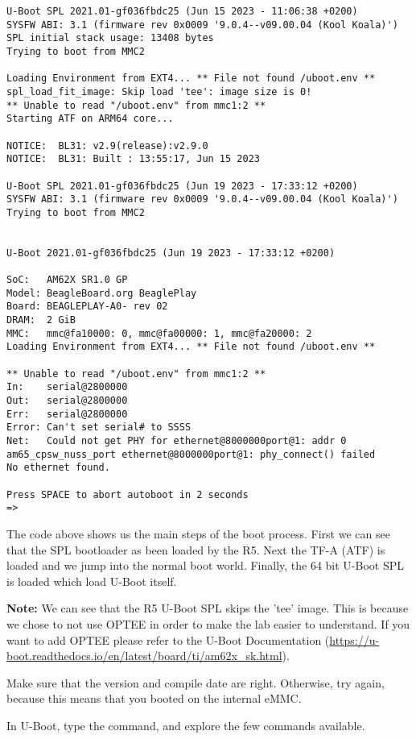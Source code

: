 \begin{verbatim}
U-Boot SPL 2021.01-gf036fbdc25 (Jun 15 2023 - 11:06:38 +0200)
SYSFW ABI: 3.1 (firmware rev 0x0009 '9.0.4--v09.00.04 (Kool Koala)')
SPL initial stack usage: 13408 bytes
Trying to boot from MMC2

Loading Environment from EXT4... ** File not found /uboot.env **
spl_load_fit_image: Skip load 'tee': image size is 0!
** Unable to read "/uboot.env" from mmc1:2 **
Starting ATF on ARM64 core...

NOTICE:  BL31: v2.9(release):v2.9.0
NOTICE:  BL31: Built : 13:55:17, Jun 15 2023

U-Boot SPL 2021.01-gf036fbdc25 (Jun 19 2023 - 17:33:12 +0200)
SYSFW ABI: 3.1 (firmware rev 0x0009 '9.0.4--v09.00.04 (Kool Koala)')
Trying to boot from MMC2


U-Boot 2021.01-gf036fbdc25 (Jun 19 2023 - 17:33:12 +0200)

SoC:   AM62X SR1.0 GP
Model: BeagleBoard.org BeaglePlay
Board: BEAGLEPLAY-A0- rev 02
DRAM:  2 GiB
MMC:   mmc@fa10000: 0, mmc@fa00000: 1, mmc@fa20000: 2
Loading Environment from EXT4... ** File not found /uboot.env **

** Unable to read "/uboot.env" from mmc1:2 **
In:    serial@2800000
Out:   serial@2800000
Err:   serial@2800000
Error: Can't set serial# to SSSS
Net:   Could not get PHY for ethernet@8000000port@1: addr 0
am65_cpsw_nuss_port ethernet@8000000port@1: phy_connect() failed
No ethernet found.

Press SPACE to abort autoboot in 2 seconds
=>
\end{verbatim}

The code above shows us the main steps of the boot process.
First we can see that the SPL bootloader as been loaded by the R5.
Next the TF-A (ATF) is loaded and we jump into the normal boot world.
Finally, the 64 bit U-Boot SPL is loaded which load U-Boot itself.

\textbf{Note:} We can see that the R5 U-Boot SPL skips the 'tee'
image. This is because we chose to not use OPTEE in order
to make the lab easier to understand. If you want to add OPTEE please refer
to the U-Boot Documentation
(\url{https://u-boot.readthedocs.io/en/latest/board/ti/am62x_sk.html}).

Make sure that the version and compile date are right. Otherwise, try
again, because this means that you booted on the internal eMMC.

In U-Boot, type the  command, and explore the few commands
available.

